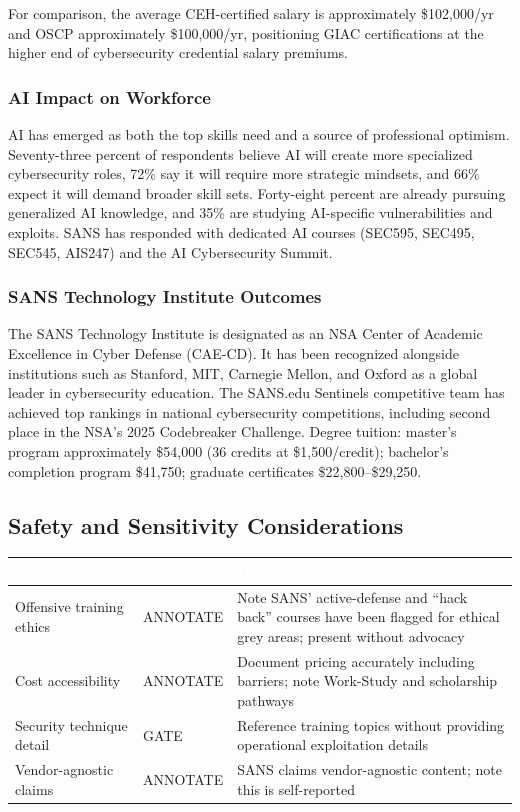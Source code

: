 \documentclass[11pt,letterpaper]{article}
\newcommand{\tableheader}[1]{\textbf{\sffamily\textcolor{white}{#1}}}
\begin{document}
For comparison, the average CEH-certified salary is approximately \$102,000/yr and OSCP approximately \$100,000/yr, positioning GIAC certifications at the higher end of cybersecurity credential salary premiums.

\subsubsection{AI Impact on Workforce}

AI has emerged as both the top skills need and a source of professional optimism. Seventy-three percent of respondents believe AI will create more specialized cybersecurity roles, 72\% say it will require more strategic mindsets, and 66\% expect it will demand broader skill sets. Forty-eight percent are already pursuing generalized AI knowledge, and 35\% are studying AI-specific vulnerabilities and exploits. SANS has responded with dedicated AI courses (SEC595, SEC495, SEC545, AIS247) and the AI Cybersecurity Summit.

\subsubsection{SANS Technology Institute Outcomes}

The SANS Technology Institute is designated as an NSA Center of Academic Excellence in Cyber Defense (CAE-CD). It has been recognized alongside institutions such as Stanford, MIT, Carnegie Mellon, and Oxford as a global leader in cybersecurity education. The SANS.edu Sentinels competitive team has achieved top rankings in national cybersecurity competitions, including second place in the NSA's 2025 Codebreaker Challenge. Degree tuition: master's program approximately \$54,000 (36 credits at \$1,500/credit); bachelor's completion program \$41,750; graduate certificates \$22,800--\$29,250.

\subsection{Safety and Sensitivity Considerations}

\begin{center}
\begin{tabularx}{\textwidth}{L{3cm}L{2cm}X}
\toprule
{}
\tableheader{Consideration} & \tableheader{Type} & \tableheader{Handling} \\
\midrule
Offensive training ethics & ANNOTATE & Note SANS' active-defense and ``hack back'' courses have been flagged for ethical grey areas; present without advocacy \\
Cost accessibility & ANNOTATE & Document pricing accurately including barriers; note Work-Study and scholarship pathways \\
Security technique detail & GATE & Reference training topics without providing operational exploitation details \\
Vendor-agnostic claims & ANNOTATE & SANS claims vendor-agnostic content; note this is self-reported \\
\bottomrule
\end{tabularx}
\end{center}
\end{document}
